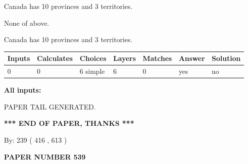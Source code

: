 \documentclass[12pt]{article}
\begin{document}
 
Canada has 10  provinces and 3 territories.
 
 
 None of above.
 
 
\noindent{}
 
 
Canada has 10  provinces and 3 territories.
 
 
\noindent{}
 
 
   
   
   
   
\noindent\begin{tabular}{|l|l|l|l|l|l|l|}
 \hline
Inputs & Calculates & Choices & Layers & Matches & Answer & Solution \\ \hline
 0  & 
 0  & 
 6
  simple  
  & 
 6  & 
 0  & 
  yes & 
  no 
  \\ \hline
 \end{tabular}
   
   
   
   
\noindent{}
   
   
   
   
\noindent\vspace{0.1in}\hspace{-0.08in} {\textbf{\Large{All inputs: }}}
   
   
   
   
   
   
 \vspace{0.2in}
 
   
   
\vspace{2.0in} PAPER TAIL GENERATED.
   
   
   
   
\vspace{1.0in} 
{\textbf{\large{ *** END OF PAPER, THANKS *** }}} 
   
   
\hspace{1.0in} By: 
 239 ( 416 ,  613 )
   
   
   
   
\newpage 
\setcounter{page}{ 
   539001 } 
   
   
   
   
 {\textbf{ \Large{ PAPER NUMBER  539  }}}
   
\end{document}
